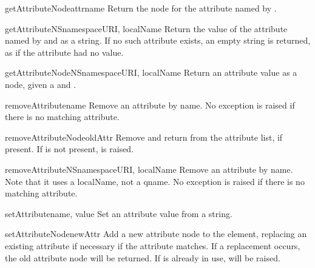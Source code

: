 \begin{methoddesc}[Element]{getAttributeNode}{attrname}
Return the  node for the attribute named by
.
\end{methoddesc}

\begin{methoddesc}[Element]{getAttributeNS}{namespaceURI, localName}
Return the value of the attribute named by  and
 as a string. If no such attribute exists, an empty
string is returned, as if the attribute had no value.
\end{methoddesc}

\begin{methoddesc}[Element]{getAttributeNodeNS}{namespaceURI, localName}
Return an attribute value as a node, given a  and
.
\end{methoddesc}

\begin{methoddesc}[Element]{removeAttribute}{name}
Remove an attribute by name.  No exception is raised if there is no
matching attribute.
\end{methoddesc}

\begin{methoddesc}[Element]{removeAttributeNode}{oldAttr}
Remove and return  from the attribute list, if present.
If  is not present,  is raised.
\end{methoddesc}

\begin{methoddesc}[Element]{removeAttributeNS}{namespaceURI, localName}
Remove an attribute by name.  Note that it uses a localName, not a
qname.  No exception is raised if there is no matching attribute.
\end{methoddesc}

\begin{methoddesc}[Element]{setAttribute}{name, value}
Set an attribute value from a string.
\end{methoddesc}

\begin{methoddesc}[Element]{setAttributeNode}{newAttr}
Add a new attribute node to the element, replacing an existing
attribute if necessary if the  attribute matches.  If a
replacement occurs, the old attribute node will be returned.  If
 is already in use,  will be
raised.
\end{methoddesc}

